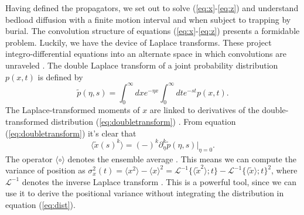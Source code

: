 \documentclass[]{agujournal2018}
\newcommand\be{\begin{equation}}
\newcommand\ee{\end{equation}}
\newcommand\bra{\langle}
\newcommand\ket{\rangle}
\newcommand\El{\mathcal{L}}
\begin{document}
Having defined the propagators, we set out to solve (\ref{eq:x}-\ref{eq:z}) and understand bedload diffusion with a finite motion interval and when subject to trapping by burial.
The convolution structure  of equations (\ref{eq:x}-\ref{eq:z}) presents a formidable problem.
Luckily, we have the device of Laplace transforms.
These project integro-differential equations into an alternate space in which convolutions are unraveled \citep[e.g.][]{Arfken1985}.
The double Laplace transform of a joint probability distribution $p(x,t)$ is defined by 
\be \tilde{p}(\eta,s) = \int_0^\infty dx e^{-\eta x}\int_0^\infty dt e^{-st} p(x,t). \label{eq:doubletransform}\ee
The Laplace-transformed moments of $x$ are linked to derivatives of the double-transformed distribution (\ref{eq:doubletransform}) \citep[cf.][]{Berezhkovskii2002}.
From equation (\ref{eq:doubletransform}) it's clear that
\be \bra \tilde{x}(s)^k \ket = (-)^k\partial_\eta^k \tilde{p}(\eta,s)\Big|_{\eta=0}.\label{eq:momenttrick}\ee
The operator $\bra \circ \ket$ denotes the ensemble average \citep[e.g.][]{Kittel1958}.
This means we can compute the variance of position as $\sigma_x^2(t) = \bra x^2 \ket - \bra x \ket^2 = \El^{-1} \{\bra\tilde{x}^2 \ket;t\} - \El^{-1} \{\bra\tilde{x} \ket;t\}^2$, where $\El^{-1}$ denotes the inverse Laplace transform \citep[e.g.][]{Arfken1985}. This is a powerful tool, since we can use it to derive the positional variance without integrating the distribution in equation (\ref{eq:dist}).
\end{document}
